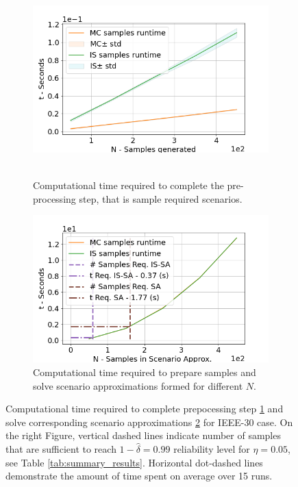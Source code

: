 \begin{figure}[hbt]

\begin{subfigure}{.48\textwidth}
  \centering
  \hspace{-4mm}\includegraphics[width=0.9\linewidth]{Dissertation/images/dc_stochastic_approx/profiling_samplig.png}~~~~~~\hfill
  \caption{Computational time required to complete the pre-processing step, that is sample required scenarios.}
  \label{fig:profile_generate_samples}
\end{subfigure}
\begin{subfigure}{.48\textwidth}
  \centering
  \includegraphics[width=0.9\linewidth]{Dissertation/images/dc_stochastic_approx/profiling_approx_sol.png}
  \caption{Computational time required to prepare samples and solve scenario approximations formed for different $N$. }
  \label{fig:profile_scenario_approx}
\end{subfigure}

\caption{Computational time required to complete prepocessing step \ref{fig:profile_generate_samples} and solve corresponding scenario approximations \ref{fig:profile_scenario_approx} for IEEE-30 case. On the right Figure, vertical dashed lines indicate number of samples that are sufficient to reach $1-\hat{\delta}=0.99$ reliability level for $\eta=0.05$, see Table \ref{tab:summary_results}. Horizontal dot-dashed lines demonstrate the amount of time spent on average over 15 runs.}
\label{fig:profiling}

\end{figure}


